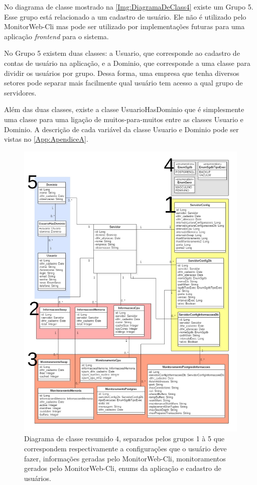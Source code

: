 No diagrama de classe mostrado na \autoref{Img:DiagramaDeClass4} existe um Grupo 5. Esse grupo está relacionado a um cadastro de usuário. Ele não é utilizado pelo MonitorWeb-Cli mas pode ser utilizado por implementações futuras para uma aplicação \textit{frontend} para o sistema. 

No Grupo 5 existem duas classes: a Usuario, que corresponde ao cadastro de contas de usuário na aplicação, e a Dominio, que corresponde a uma classe para dividir os usuários por grupo. Dessa forma, uma empresa que tenha diversos setores pode separar mais facilmente qual usuário tem acesso a qual grupo de servidores.

Além das duas classes, existe a classe UsuarioHasDominio que é simplesmente uma classe para uma ligação de muitos-para-muitos entre as classes Usuario e Dominio. A descrição de cada variável da classe Usuario e Dominio pode ser vistas no \autoref{App:ApendiceA}.
 
\begin{figure}[H]
	\centering
	\includegraphics[width=1.0\textwidth]{figuras/DiagramaDeClass4.jpg}
	\caption[Diagrama de classe resumido 3.]{Diagrama de classe resumido 4, separados pelos grupos 1 à 5 que correspondem respectivamente a configurações que o usuário deve fazer, informações geradas pelo MonitorWeb-Cli, monitoramentos gerados pelo MonitorWeb-Cli, enums da aplicação e cadastro de usuários.}
	\label{Img:DiagramaDeClass4}
\end{figure}


